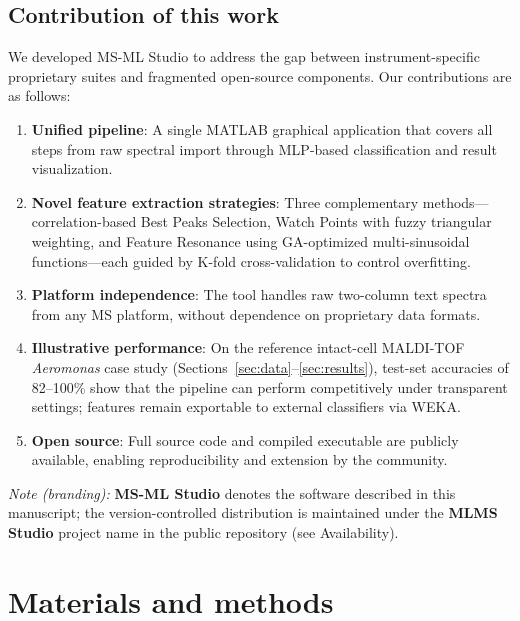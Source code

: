 \documentclass[preprint,12pt]{elsarticle}
\begin{document}
\subsection{Contribution of this work}
We developed MS-ML Studio to address the gap between instrument-specific proprietary suites and fragmented open-source components. Our contributions are as follows:
\begin{enumerate}
  \item \textbf{Unified pipeline}: A single MATLAB graphical application that covers all steps from raw spectral import through MLP-based classification and result visualization.
  \item \textbf{Novel feature extraction strategies}: Three complementary methods---correlation-based Best Peaks Selection, Watch Points with fuzzy triangular weighting, and Feature Resonance using GA-optimized multi-sinusoidal functions---each guided by K-fold cross-validation to control overfitting.
  \item \textbf{Platform independence}: The tool handles raw two-column text spectra from any MS platform, without dependence on proprietary data formats.
  \item \textbf{Illustrative performance}: On the reference intact-cell MALDI-TOF \textit{Aeromonas} case study (Sections~\ref{sec:data}--\ref{sec:results}), test-set accuracies of 82--100\% show that the pipeline can perform competitively under transparent settings; features remain exportable to external classifiers via WEKA.
  \item \textbf{Open source}: Full source code and compiled executable are publicly available, enabling reproducibility and extension by the community.
\end{enumerate}

\textit{Note (branding):} \textbf{MS-ML Studio} denotes the software described in this manuscript; the version-controlled distribution is maintained under the \textbf{MLMS Studio} project name in the public repository (see Availability).

\section{Materials and methods}
\label{sec:methods}
\end{document}
